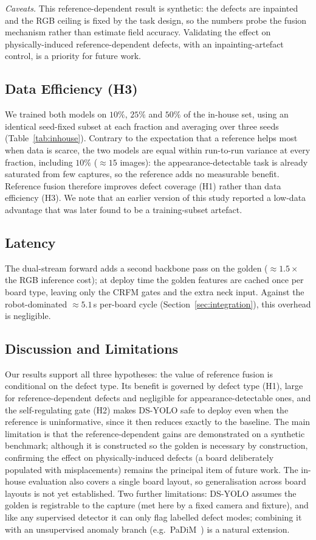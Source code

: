 \documentclass[conference]{IEEEtran}
\begin{document}
\noindent\emph{Caveats.} This reference-dependent result is synthetic: the defects
are inpainted and the RGB ceiling is fixed by the task design, so the numbers
probe the fusion mechanism rather than estimate field accuracy. Validating the
effect on physically-induced reference-dependent defects, with an
inpainting-artefact control, is a priority for future work.

\subsection{Data Efficiency (H3)}
We trained both models on $10\%$, $25\%$ and $50\%$ of the in-house set, using an
identical seed-fixed subset at each fraction and averaging over three seeds
(Table~\ref{tab:inhouse}). Contrary to the expectation that a reference helps most
when data is scarce, the two models are equal within run-to-run variance at every
fraction, including $10\%$ (${\approx}15$ images): the appearance-detectable task is
already saturated from few captures, so the reference adds no measurable benefit.
Reference fusion
therefore improves defect coverage (H1) rather than data efficiency (H3). We note
that an earlier version of this study reported a low-data advantage that was later
found to be a training-subset artefact.

\subsection{Latency}
The dual-stream forward adds a second backbone pass on the golden
(${\approx}1.5\times$ the RGB inference cost); at deploy time the golden features
are cached once per board type, leaving only the CRFM gates and the extra neck
input. Against the robot-dominated ${\approx}5.1$\,s per-board cycle
(Section~\ref{sec:integration}), this overhead is negligible.

\subsection{Discussion and Limitations}
Our results support all three hypotheses: the value of reference fusion is
conditional on the defect type. Its benefit is governed by defect type (H1), large
for reference-dependent defects and negligible for appearance-detectable ones, and
the self-regulating gate (H2) makes DS-YOLO safe to deploy even when the reference
is uninformative, since it then reduces exactly to the baseline. The main limitation is that the reference-dependent
gains are demonstrated on a synthetic benchmark; although it is
constructed so the golden is necessary by construction, confirming the effect on
physically-induced defects (a board deliberately populated with misplacements)
remains the principal item of future work. The in-house evaluation also covers a
single board layout, so generalisation across board layouts is not yet
established. Two further limitations: DS-YOLO assumes the golden is registrable to
the capture (met here by a fixed camera and fixture), and like any supervised
detector it can only flag labelled defect modes; combining it with an unsupervised
anomaly branch (e.g.\ PaDiM~\cite{defard2021padim}) is a natural extension.
\end{document}
